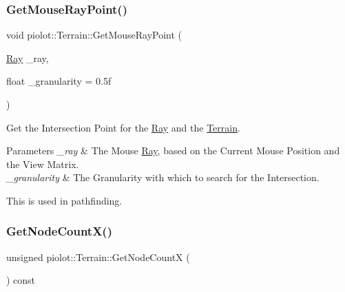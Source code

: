 \mbox{\label{classpiolot_1_1_terrain_a527f6f0fe0d2085280e95bf6540987a2}} 
\subsubsection{\texorpdfstring{Get\+Mouse\+Ray\+Point()}{GetMouseRayPoint()}}
{\footnotesize\ttfamily void piolot\+::\+Terrain\+::\+Get\+Mouse\+Ray\+Point (\begin{DoxyParamCaption}\item[{\mbox{\hyperlink{classpiolot_1_1_ray}{Ray}}}]{\+\_\+ray,  }\item[{float}]{\+\_\+granularity = {\ttfamily 0.5f} }\end{DoxyParamCaption})}



Get the Intersection Point for the \mbox{\hyperlink{classpiolot_1_1_ray}{Ray}} and the \mbox{\hyperlink{classpiolot_1_1_terrain}{Terrain}}. 


\begin{DoxyParams}{Parameters}
{\em \+\_\+ray} & The Mouse \mbox{\hyperlink{classpiolot_1_1_ray}{Ray}}, based on the Current Mouse Position and the View Matrix. \\
\hline
{\em \+\_\+granularity} & The Granularity with which to search for the Intersection.\\
\hline
\end{DoxyParams}
This is used in pathfinding. \mbox{\label{classpiolot_1_1_terrain_a284fb2b373798b73d3893837cfe5d4bc}} 
\subsubsection{\texorpdfstring{Get\+Node\+Count\+X()}{GetNodeCountX()}}
{\footnotesize\ttfamily unsigned piolot\+::\+Terrain\+::\+Get\+Node\+CountX (\begin{DoxyParamCaption}{ }\end{DoxyParamCaption}) const\hspace{0.3cm}{\ttfamily [inline]}}

